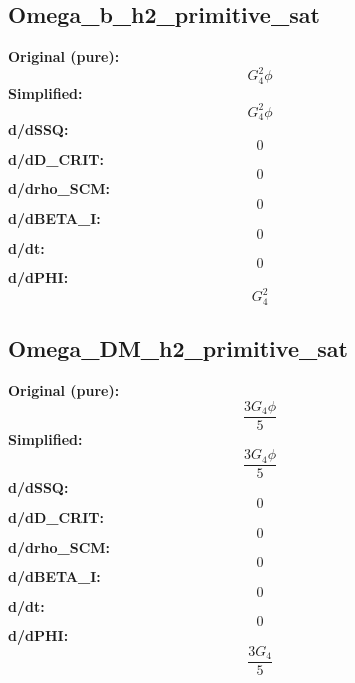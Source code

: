 \subsection{Omega_b_h2_primitive_sat}
\textbf{Original (pure):}
\begin{equation}
G_{4}^{2} \phi
\end{equation}
\textbf{Simplified:}
\begin{equation}
G_{4}^{2} \phi
\end{equation}
\textbf{d/dSSQ:}
\begin{equation}
0
\end{equation}
\textbf{d/dD_CRIT:}
\begin{equation}
0
\end{equation}
\textbf{d/drho_SCM:}
\begin{equation}
0
\end{equation}
\textbf{d/dBETA_I:}
\begin{equation}
0
\end{equation}
\textbf{d/dt:}
\begin{equation}
0
\end{equation}
\textbf{d/dPHI:}
\begin{equation}
G_{4}^{2}
\end{equation}

\subsection{Omega_DM_h2_primitive_sat}
\textbf{Original (pure):}
\begin{equation}
\frac{3 G_{4} \phi}{5}
\end{equation}
\textbf{Simplified:}
\begin{equation}
\frac{3 G_{4} \phi}{5}
\end{equation}
\textbf{d/dSSQ:}
\begin{equation}
0
\end{equation}
\textbf{d/dD_CRIT:}
\begin{equation}
0
\end{equation}
\textbf{d/drho_SCM:}
\begin{equation}
0
\end{equation}
\textbf{d/dBETA_I:}
\begin{equation}
0
\end{equation}
\textbf{d/dt:}
\begin{equation}
0
\end{equation}
\textbf{d/dPHI:}
\begin{equation}
\frac{3 G_{4}}{5}
\end{equation}

